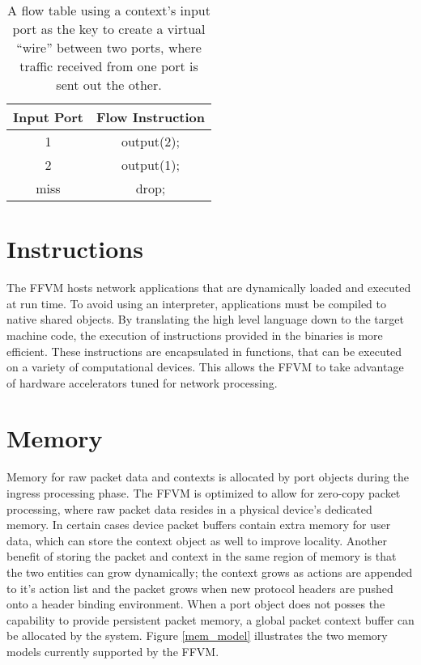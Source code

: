 \begin{table}[h]
  \centering
  \begin{tabular}{||c | c||}
   \hline
   Input Port & Flow Instruction \\ [0.5ex]
   \hline\hline
   1 & output(2); \\
   \hline
   2 & output(1); \\
   \hline
   miss & drop; \\ [1ex]
   \hline
 \end{tabular}
 \caption{A flow table using a context's input port as the key to create a
 virtual ``wire'' between two ports, where traffic received from one port is
 sent out the other.}
 \label{flow_table}
\end{table}


\section{Instructions}
\label{vm:insn}
The FFVM hosts network applications that are dynamically loaded and executed
at run time. To avoid using an interpreter, applications must be compiled
to native shared objects. By translating the high level language down to the
target machine code, the execution of instructions provided in the binaries is
more efficient. These instructions are encapsulated in functions, that can be
executed on a variety of computational devices. This allows the FFVM to take
advantage of hardware accelerators tuned for network processing.


\section{Memory}
\label{vm:memory}
Memory for raw packet data and contexts is allocated by port objects during the
ingress processing phase. The FFVM is optimized to allow for zero-copy packet
processing, where raw packet data resides in a physical device's dedicated
memory. In certain cases device packet buffers contain extra memory for user
data, which can store the context object as well to improve locality. Another
benefit of storing the packet and context in the same region of memory is that
the two entities can grow dynamically; the context grows as actions are appended
to it's action list and the packet grows when new protocol headers are pushed
onto a header binding environment. When a port object does not posses the
capability to provide persistent packet memory, a global packet context buffer
can be allocated by the system. Figure \ref{mem_model} illustrates the two
memory models currently supported by the FFVM.

